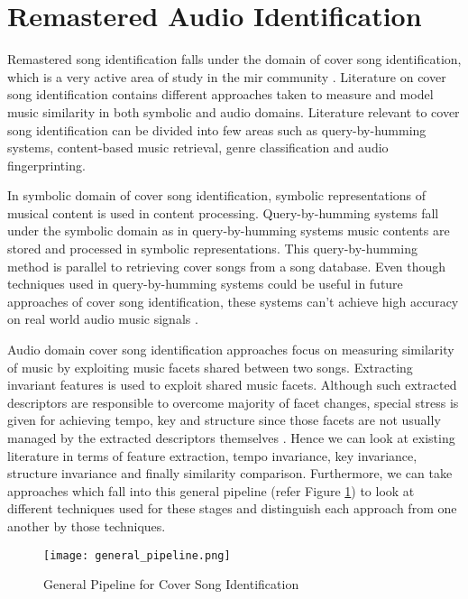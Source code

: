 \section{Remastered Audio Identification}

Remastered song identification falls under the domain of cover song identification,
which is a very active area of study in the \ac{mir} community \cite{SerraBook}.
Literature on cover song identification contains different approaches taken to
measure and model music similarity in both symbolic and audio domains. Literature
relevant to cover song identification can be divided into few areas such as
query-by-humming systems, content-based music retrieval, genre classification
and audio fingerprinting.

In symbolic domain of cover song identification, symbolic representations of
musical content is used in content processing. Query-by-humming systems
\cite{query_by_humming} fall under the symbolic domain as in query-by-humming
systems music contents are stored and processed in symbolic representations.
This query-by-humming method is parallel to retrieving cover songs from a song
database. Even though techniques used in query-by-humming systems could be useful
in future approaches of cover song identification, these systems can't achieve
high accuracy on real world audio music signals \cite{comparative_query_by_humming,SerraBook}.


Audio domain cover song identification approaches focus on measuring similarity
of music by exploiting music facets shared between two songs. Extracting invariant
features is used to exploit shared music facets. Although such extracted descriptors
are responsible to overcome majority of facet changes, special stress is given for
achieving tempo, key and structure since those facets are not usually managed by
the extracted descriptors themselves \cite{SerraBook}. Hence we can look at existing
literature in terms of feature extraction, tempo invariance, key invariance, structure
invariance and finally similarity comparison. Furthermore, we can take approaches which fall
into this general pipeline (refer Figure \ref{fig:general_pipeline}) to look at different techniques used for these stages and
distinguish each approach from one another by those techniques.

\begin{figure}[H]
    \centering
    \texttt{[image: general\_pipeline.png]}
    \caption{General Pipeline for Cover Song Identification}
    \label{fig:general_pipeline}
\end{figure}


